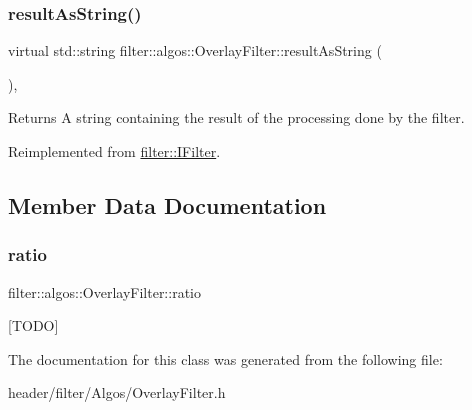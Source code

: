 \subsubsection{\texorpdfstring{result\+As\+String()}{resultAsString()}}
{\footnotesize\ttfamily virtual std\+::string filter\+::algos\+::\+Overlay\+Filter\+::result\+As\+String (\begin{DoxyParamCaption}{ }\end{DoxyParamCaption})\hspace{0.3cm}{\ttfamily [inline]}, {\ttfamily [virtual]}}

\begin{DoxyReturn}{Returns}
A string containing the result of the processing done by the filter. 
\end{DoxyReturn}


Reimplemented from \hyperlink{classfilter_1_1_i_filter_ab99902b060a6d9edc3452a8c9f85e37e}{filter\+::\+I\+Filter}.



\subsection{Member Data Documentation}
\mbox{\label{classfilter_1_1algos_1_1_overlay_filter_ad10bfe397690edb6bfef4bedc203f79a}} 
\subsubsection{\texorpdfstring{ratio}{ratio}}
{\footnotesize\ttfamily filter\+::algos\+::\+Overlay\+Filter\+::ratio}

\mbox{[}T\+O\+DO\mbox{]} 

The documentation for this class was generated from the following file\+:\begin{DoxyCompactItemize}
\item 
header/filter/\+Algos/Overlay\+Filter.\+h\end{DoxyCompactItemize}

